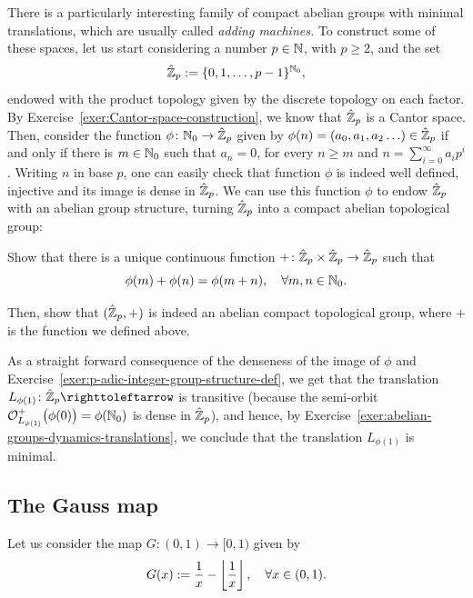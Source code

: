 There is a particularly interesting family of compact abelian groups with minimal translations, which are usually called \emph{adding machines.} To construct some of these spaces, let us start considering a number $p\in\mathbb{N}$, with $p\geq 2$, and the set
\begin{displaymath}
  \hat{\mathbb{Z}}_p:=\{0,1,\ldots,p-1\}^{\mathbb{N}_0},
\end{displaymath}
endowed with the product topology given by the discrete topology on each factor. By Exercise~\ref{exer:Cantor-space-construction}, we know that $\hat{\mathbb{Z}}_p$ is a Cantor space.
Then, consider the function $\phi\colon\mathbb{N}_0\to\hat{\mathbb{Z}}_p$ given by $\phi(n)=(a_0,a_1,a_2\ldots)\in\hat{\mathbb{Z}}_p$ if and only if there is $m\in\mathbb{N}_0$ such that $a_n=0$, for every $n\geq m$ and $n=\sum_{i=0}^\infty a_ip^i$. Writing $n$ in base $p$, one can easily check that function $\phi$ is indeed well defined, injective and its image is dense in $\hat{\mathbb{Z}}_p$. We can use this function $\phi$ to endow $\hat{\mathbb{Z}}_p$ with an abelian group structure, turning $\hat{\mathbb{Z}}_p$ into a compact abelian topological group:

\begin{exercise}\label{exer:p-adic-integer-group-structure-def}
  Show that there is a unique continuous function $+\colon\hat{\mathbb{Z}}_p\times\hat{\mathbb{Z}}_p\to\hat{\mathbb{Z}}_p$ such that
  \begin{displaymath}
    \phi(m)+\phi(n)=\phi(m+n), \quad\forall m,n\in\mathbb{N}_0.
  \end{displaymath}

  Then, show that $(\hat{\mathbb{Z}}_p,+)$ is indeed an abelian compact topological group, where $+$ is the function we defined above.
\end{exercise}

As a straight forward consequence of the denseness of the image of $\phi$ and Exercise~\ref{exer:p-adic-integer-group-structure-def}, we get that the translation $L_{\phi(1)}\colon\hat\Z_p\carr$ is transitive (because the semi-orbit $\mathcal{O}_{L_{\phi(1)}}^+\big(\phi(0)\big)=\phi(\mathbb{N}_0)$ is dense in $\hat{\mathbb{Z}}_p$), and hence, by Exercise~\ref{exer:abelian-groups-dynamics-translations}, we conclude that the translation $L_{\phi(1)}$ is minimal.

\subsection{The Gauss map}\label{sec:gauss-map}

Let us consider the map $G\colon (0,1)\to [0,1)$ given by
\begin{displaymath}
  G(x):=\frac{1}{x}-\left\lfloor{\frac{1}{x}}\right\rfloor, \quad\forall x\in (0,1).
\end{displaymath}


